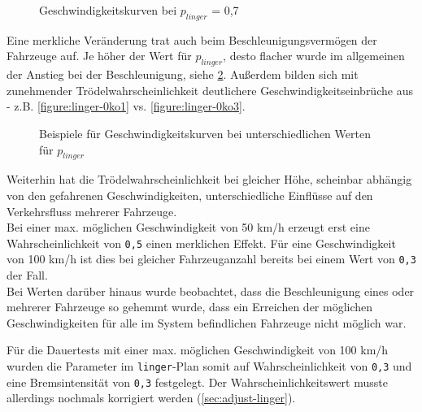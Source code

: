 \begin{figure}[hptb]
  \centering 
   \qquad
   \qquad
  \caption{Geschwindigkeitskurven bei $p_{linger}$ = 0,7}
  \label{figure:linger-0ko7}
\end{figure}

Eine merkliche Veränderung trat auch beim Beschleunigungsvermögen der Fahrzeuge auf.
Je höher der Wert für $ p_{linger} $, desto flacher wurde im allgemeinen der Anstieg bei der Beschleunigung, siehe \cref{figure:linger-0ko1-3-5}.
Außerdem bilden sich mit zunehmender Trödelwahrscheinlichkeit deutlichere Geschwindigkeitseinbrüche aus - z.B. \cref{figure:linger-0ko1} vs. \cref{figure:linger-0ko3}.

\begin{figure}[hptb]
  \centering 
   \qquad
   \qquad
  \caption{Beispiele für Geschwindigkeitskurven bei unterschiedlichen Werten für $p_{linger}$}
  \label{figure:linger-0ko1-3-5}
\end{figure}

Weiterhin hat die Trödelwahrscheinlichkeit bei gleicher Höhe, scheinbar abhängig von den gefahrenen Geschwindigkeiten, unterschiedliche Einflüsse auf den Verkehrsfluss mehrerer Fahrzeuge.
\\
Bei einer max. möglichen Geschwindigkeit von 50 km/h erzeugt erst eine Wahrscheinlichkeit von \texttt{0,5} einen merklichen Effekt. Für eine Geschwindigkeit von 100 km/h ist dies bei gleicher Fahrzeuganzahl bereits bei einem Wert von \texttt{0,3} der Fall.
\\
Bei Werten darüber hinaus wurde beobachtet, dass die Beschleunigung eines oder mehrerer Fahrzeuge so gehemmt wurde, dass ein Erreichen der möglichen Geschwindigkeiten für alle im System befindlichen Fahrzeuge nicht möglich war.

Für die Dauertests mit einer max. möglichen Geschwindigkeit von 100 km/h wurden die Parameter im \texttt{linger}-Plan somit auf Wahrscheinlichkeit von \texttt{0,3} und eine Bremsintensität von \texttt{0,3} festgelegt.
Der Wahrscheinlichkeitswert musste allerdings nochmals korrigiert werden (\cref{sec:adjust-linger}).



